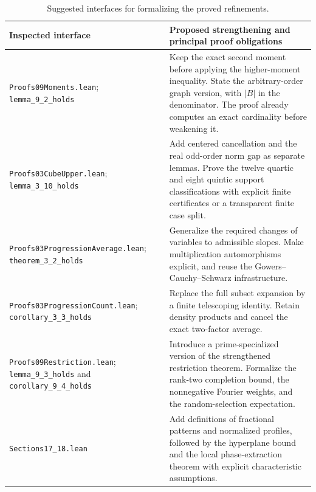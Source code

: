 \documentclass[11pt,letterpaper]{article}
\numberwithin{equation}{section}
\theoremstyle{definition}
\theoremstyle{remark}
\newcommand{\1}{\mathbf 1}
\begin{document}
\begin{table}[htbp]
\centering
\small
\renewcommand{\arraystretch}{1.2}
\begin{tabularx}{\textwidth}{@{}>{\raggedright\arraybackslash}p{}>{\raggedright\arraybackslash}X@{}}
\toprule
Inspected interface & Proposed strengthening and principal proof obligations\\
\midrule
\texttt{Proofs09Moments.lean};
\texttt{lemma\_9\_2\_holds}
& Keep the exact second moment before applying the higher-moment inequality.
State the arbitrary-order graph version, with \(|B|\) in the denominator.
The proof already computes an exact cardinality before weakening it.\\
\texttt{Proofs03CubeUpper.lean};
\texttt{lemma\_3\_10\_holds}
& Add centered cancellation and the real odd-order norm gap as separate
lemmas.  Prove the twelve quartic and eight quintic support classifications
with explicit finite certificates or a transparent finite case split.\\
\texttt{Proofs03ProgressionAverage.lean};
\texttt{theorem\_3\_2\_holds}
& Generalize the required changes of variables to admissible slopes.
Make multiplication automorphisms explicit, and reuse the
Gowers--Cauchy--Schwarz infrastructure.\\
\texttt{Proofs03ProgressionCount.lean};
\texttt{corollary\_3\_3\_holds}
& Replace the full subset expansion by a finite telescoping identity.
Retain density products and cancel the exact two-factor average.\\
\texttt{Proofs09Restriction.lean};
\texttt{lemma\_9\_3\_holds} and
\texttt{corollary\_9\_4\_holds}
& Introduce a prime-specialized version of the strengthened restriction
theorem.  Formalize the rank-two completion bound, the nonnegative
Fourier weights, and the random-selection expectation.\\
\texttt{Sections17\_18.lean}
& Add definitions of fractional patterns and normalized profiles, followed
by the hyperplane bound and the local phase-extraction theorem with
explicit characteristic assumptions.\\
\bottomrule
\end{tabularx}
\caption{Suggested interfaces for formalizing the proved refinements.}
\end{table}
\end{document}
